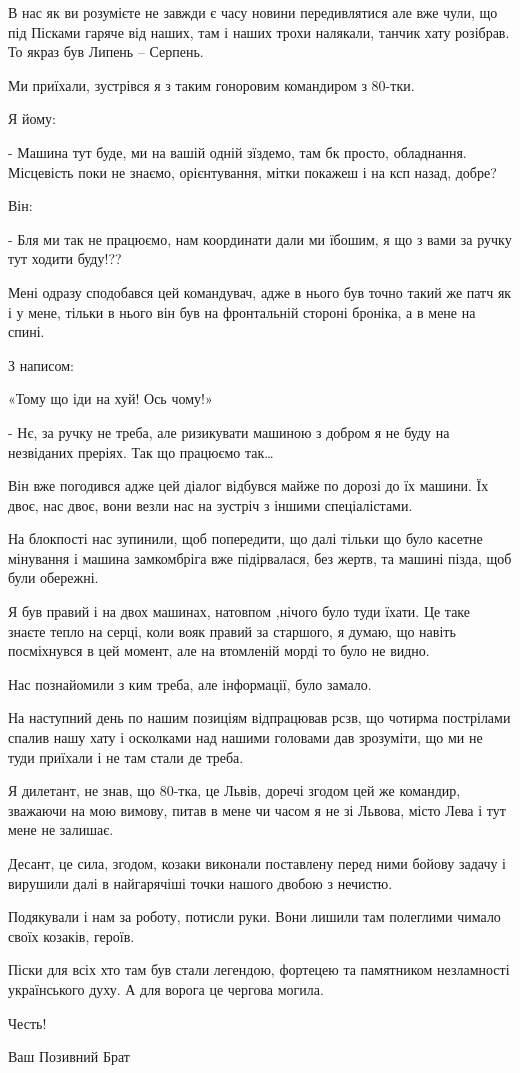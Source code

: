 В нас як ви розумієте не завжди є часу новини передивлятися але вже чули, що
під Пісками гаряче від наших, там і наших трохи налякали, танчик хату розібрав.
То якраз був Липень – Серпень.

Ми приїхали, зустрівся я з таким гоноровим командиром з 80-тки.

Я йому:

- Машина тут буде, ми на вашій одній зїздемо, там бк просто, обладнання.
Місцевість поки не знаємо, орієнтування, мітки покажеш і на ксп назад, добре?

Він:

- Бля ми так не працюємо, нам координати дали ми їбошим, я що з вами за ручку
тут ходити буду!??

Мені одразу сподобався цей командувач, адже в нього був точно такий же патч як
і у мене, тільки в нього він був на фронтальній стороні броніка, а в мене на
спині.

З написом:

«Тому що іди на хуй! Ось чому!»

- Нє, за ручку не треба, але ризикувати машиною з добром я не буду на
незвіданих преріях. Так що працюємо так…

Він вже погодився адже цей діалог відбувся майже по дорозі до їх машини. Їх
двоє, нас двоє, вони везли нас на зустріч з іншими спеціалістами. 

На блокпості нас зупинили, щоб попередити, що далі тільки що було касетне
мінування і машина замкомбріга вже підірвалася, без жертв, та машині пізда,
щоб були обережні.

Я був правий і на двох машинах, натовпом ,нічого було туди їхати. Це таке
знаєте тепло на серці, коли вояк правий за старшого, я думаю, що навіть
посміхнувся в цей момент, але на втомленій морді то було не видно. 

Нас познайомили з ким треба, але інформації, було замало.

На наступний день  по нашим позиціям відпрацював рсзв, що чотирма пострілами
спалив нашу хату і осколками над нашими головами дав зрозуміти, що ми не туди
приїхали і не там стали де треба.  

Я дилетант, не знав, що 80-тка, це Львів, доречі згодом цей же командир,
зважаючи на мою вимову, питав в мене чи часом я не зі Львова, місто Лева і тут
мене не залишає. 

Десант, це сила, згодом, козаки виконали поставлену перед ними бойову задачу і
вирушили далі в найгарячіші точки нашого двобою з нечистю.

Подякували і нам за роботу, потисли руки. Вони лишили там полеглими чимало
своїх козаків, героїв.

Піски для всіх хто там був стали легендою, фортецею та памятником незламності
українського духу. А для ворога це чергова могила.

Честь!

Ваш  Позивний Брат
